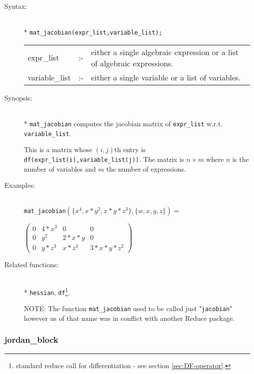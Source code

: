 \begin{description}
\item[Syntax:]\mbox{}\\*
\texttt{mat\_jacobian(expr\_list,variable\_list);}\\[2mm]
\begin{tabular}{l l p{.72\linewidth}}
expr\_list  &:-& either a
single algebraic expression or a list of algebraic expressions.\\
variable\_list &:-& either a single variable or a list of variables.
\end{tabular}

\item[Synopsis:]\mbox{}\\*
\texttt{mat\_jacobian} computes the jacobian matrix of \texttt{expr\_list} w.r.t.
\texttt{variable\_list}.

This is a matrix whose $(i,j)$th entry
is \texttt{df(expr\_list(i),variable\_list(j))}.  The matrix is $n\times m$
where $n$ is the number of variables and $m$ the number of expressions.

\item[Examples:]\mbox{}\\
  \texttt{mat\_jacobian}\((\{x^4,x*y^2,x*y*z^3\},\{w,x,y,z\}) =\)

  \(\begin{pmatrix} 0 & 4*x^3 & 0 & 0 \\ 0 & y^2 & 2*x*y & 0 \\
  0 & y*z^3 & x*z^3 & 3*x*y*z^2
  \end{pmatrix}\)

\item[Related functions:]\mbox{}\\*
\texttt{hessian}, \texttt{df}\footnote{standard reduce call
for differentiation - see section \protect\ref{sec:DF-operator}.}.

NOTE: The function \texttt{mat\_jacobian} used to be called just "\texttt{jacobian}"
however us of that name was in conflict with another Reduce package.
\end{description}


\subsubsection{jordan\_block}
\label{linalg:jordan_block}
\hypertarget{operator:JORDAN_BLOCK}{}

